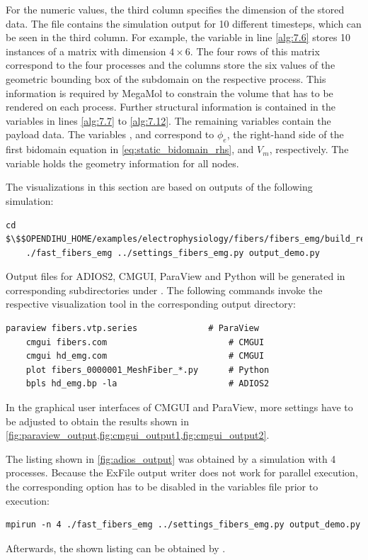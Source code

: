 For the numeric values, the third column specifies the dimension of the stored data. The file contains the simulation output for 10 different timesteps, which can be seen in the third column. For example, the  variable in line \ref{alg:7.6} stores 10 instances of a matrix with dimension $4\times 6$. The four rows of this matrix correspond to the four processes and the columns store the six values of the geometric bounding box of the subdomain on the respective process. This information is required by MegaMol to constrain the volume that has to be rendered on each process. Further structural information is contained in the variables in lines \ref{alg:7.7} to \ref{alg:7.12}. 
The remaining variables contain the payload data.  The variables ,  and  correspond to $\phi_e$, the right-hand side of the first bidomain equation in \cref{eq:static_bidomain_rhs}, and $V_m$, respectively. The variable   holds the geometry information for all nodes.


\begin{reproduce_no_break}
  The visualizations in this section are based on outputs of the following simulation:
  \begin{lstlisting}[columns=fullflexible,breaklines=true,postbreak=\mbox{\textcolor{gray}{$\hookrightarrow$}\space}]
    cd $\$$OPENDIHU_HOME/examples/electrophysiology/fibers/fibers_emg/build_release
    ./fast_fibers_emg ../settings_fibers_emg.py output_demo.py
  \end{lstlisting}
  
  Output files for ADIOS2, CMGUI, ParaView and Python will be generated in corresponding subdirectories under .
  The following commands invoke the respective visualization tool in the corresponding output directory:
  \begin{lstlisting}[columns=fullflexible,breaklines=true,postbreak=\mbox{\textcolor{gray}{$\hookrightarrow$}\space}]
    paraview fibers.vtp.series              # ParaView
    cmgui fibers.com                        # CMGUI
    cmgui hd_emg.com                        # CMGUI
    plot fibers_0000001_MeshFiber_*.py      # Python
    bpls hd_emg.bp -la                      # ADIOS2
  \end{lstlisting}
  In the graphical user interfaces of CMGUI and ParaView, more settings have to be adjusted to obtain the results shown in \cref{fig:paraview_output,fig:cmgui_output1,fig:cmgui_output2}.
  
  The listing shown in \cref{fig:adios_output} was obtained by a simulation with 4 processes. 
  Because the ExFile output writer does not work for parallel execution, the corresponding option has to be disabled in the  variables file prior to execution:
  \begin{lstlisting}[columns=fullflexible,breaklines=true,postbreak=\mbox{\textcolor{gray}{$\hookrightarrow$}\space}]
    mpirun -n 4 ./fast_fibers_emg ../settings_fibers_emg.py output_demo.py
  \end{lstlisting}
  Afterwards, the shown listing can be obtained by .
\end{reproduce_no_break}

